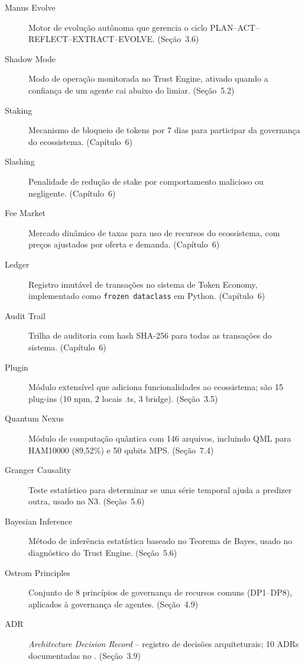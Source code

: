 \begin{description}
\item[Manus Evolve] Motor de evolução autônoma que gerencia o ciclo
PLAN--ACT--REFLECT--EXTRACT--EVOLVE. (Seção~3.6)

\item[Shadow Mode] Modo de operação monitorada no Trust Engine, ativado
quando a confiança de um agente cai abaixo do limiar. (Seção~5.2)

\item[Staking] Mecanismo de bloqueio de tokens por 7 dias para
participar da governança do ecossistema. (Capítulo~6)

\item[Slashing] Penalidade de redução de stake por comportamento
malicioso ou negligente. (Capítulo~6)

\item[Fee Market] Mercado dinâmico de taxas para uso de recursos do
ecossistema, com preços ajustados por oferta e demanda.
(Capítulo~6)

\item[Ledger] Registro imutável de transações no sistema de Token
Economy, implementado como \texttt{frozen dataclass} em Python.
(Capítulo~6)

\item[Audit Trail] Trilha de auditoria com hash SHA-256 para todas as
transações do sistema. (Capítulo~6)

\item[Plugin] Módulo extensível que adiciona funcionalidades ao
ecossistema; são 15 plug-ins (10 npm, 2 locais .ts, 3 bridge).
(Seção~3.5)

\item[Quantum Nexus] Módulo de computação quântica com 146 arquivos,
incluindo QML para HAM10000 (89,52\%) e 50 qubits MPS.
(Seção~7.4)

\item[Granger Causality] Teste estatístico para determinar se uma série
temporal ajuda a predizer outra, usado no N3. (Seção~5.6)

\item[Bayesian Inference] Método de inferência estatística baseado no
Teorema de Bayes, usado no diagnóstico do Trust Engine.
(Seção~5.6)

\item[Ostrom Principles] Conjunto de 8 princípios de governança de
recursos comuns (DP1--DP8), aplicados à governança de agentes.
(Seção~4.9)

\item[ADR] \emph{Architecture Decision Record} -- registro de decisões
arquiteturais; 10 ADRs documentadas no \opencodeeco{}.
(Seção~3.9)


\end{description}
